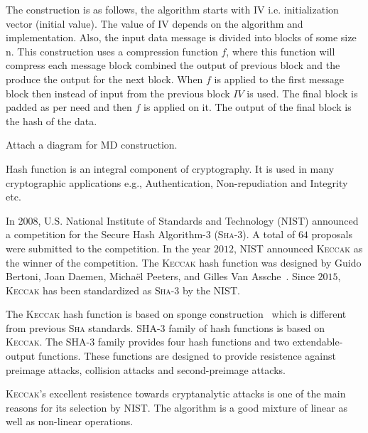 \documentclass[runningheads]{llncs}
\newcommand{\KECCAK}{\mbox{\textsc{Keccak}}}
\newcommand{\Keccak}{\mbox{\textsc{Keccak}}}
\newcommand{\SHA}{\textsc{Sha}}
\begin{document}
The construction is as follows, the algorithm starts with IV i.e. initialization vector (initial value). The value of IV depends on the algorithm and implementation. Also, the input data message is divided into blocks of some size n.
This construction uses a compression function $f$, where this function will compress each message block combined the output of previous block and the produce the output for the next block. When $f$ is applied to the first message block then instead of input from the previous block $IV$ is used. The final block is padded as per need and then $f$ is applied on it. The output of the final block is the hash of the data.

Attach a diagram for MD construction.

Hash function is an integral component of cryptography. It is used in many cryptographic applications e.g., Authentication, Non-repudiation and Integrity etc.

In 2008, U.S. National Institute of Standards and Technology (NIST) announced a competition for the Secure Hash Algorithm-3 (\SHA-3). A total of $64$ proposals were submitted to the competition. In the year $2012$, NIST announced \KECCAK{} as the winner of the competition. The \KECCAK{} hash function was designed by Guido Bertoni, Joan Daemen, Micha\"{e}l Peeters, and Gilles Van Assche~\cite{bertoni2009keccak}. Since $2015$, \KECCAK{} has been standardized as \SHA-$3$ by the NIST.

The \KECCAK{} hash function is based on sponge construction~\cite{bertoni2011cryptographic} which is different from previous \SHA{} standards. SHA-3 family of hash functions is based on \Keccak{}. The SHA-3 family provides four hash functions and two extendable-output functions. These functions are designed to provide resistence against preimage attacks, collision attacks and second-preimage attacks.

\Keccak{}'s excellent resistence towards cryptanalytic attacks is one of the main reasons for its selection by NIST. The algorithm is a good mixture of linear as well as non-linear operations.
\end{document}

